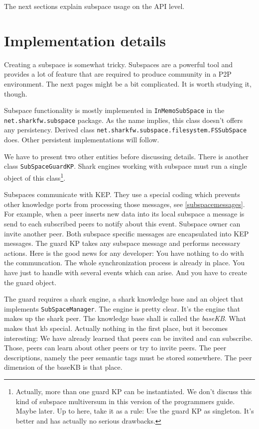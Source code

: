 The next sections explain subspace usage on the API level.

\section{Implementation details}
Creating a subspace is somewhat tricky. Subspaces are a powerful tool and
provides a lot of feature that are required to produce community in a P2P 
environment. The next pages might be a bit complicated. It is worth studying it, though.

Subspace functionality is mostly implemented in {\tt InMemoSubSpace} in the 
{\tt net.sharkfw.subspace} package. As the name implies, this class doesn't offers any persistency. Derived class {\tt net.sharkfw.subspace.filesystem.FSSubSpace} does. Other persistent implementations will follow.

We have to present two other entities before discussing details. 
There is another class {\tt SubSpaceGuardKP}. Shark engines working with subspace must run a single object of this class\footnote{Actually, more than
one guard KP can be instantiated. We don't discuss this kind of subspace multiversum in this version of the programmers guide. Maybe later. Up to here, take it as a rule: Use the guard KP as singleton. It's better and has actually no serious drawbacks.}.

Subspaces communicate with KEP. They use a special coding which prevents other knowledge ports from processing those messages, see \ref{subspacemessages}.
For example, when a peer inserts new data into its local subspace a message is
send to each subscribed peers to notify about this event. Subspace owner can
invite another peer. Both subspace specific messages are encapsulated into KEP messages. The guard KP takes any subspace message and performs necessary actions. Here is the good news for any developer: You have nothing to do with the communcation. The whole synchronization process is already in place. You have just to handle with several events which can arise. And you have to create the guard object.

The guard requires a shark engine, a shark knowledge base and an object that implements {\tt SubSpaceManager}. The engine is pretty clear. It's the engine that makes up the shark peer. The knowledge base shall is called the {\it baseKB}. What makes that kb special. Actually nothing in the first place, but it becomes interesting: We have already learned that peers can be invited and can subscribe. Those, peers can learn about other peers or try to invite peers. The peer descriptions, namely the peer semantic tags must be stored somewhere. The peer dimension of the baseKB is that place. 

